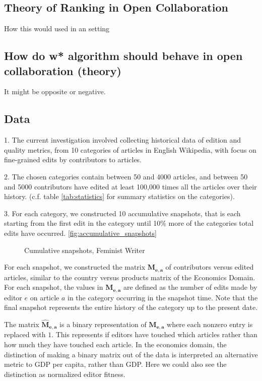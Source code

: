 \documentclass{acm_proc_article-sp}
\begin{document}
\subsection{Theory of Ranking in Open Collaboration}
How this would used in an setting

\subsection{How do w* algorithm should behave in open collaboration (theory)}

It might be opposite or negative.

\subsection{Data}
1. The current investigation involved collecting historical data of edition and quality metrics, from 10 categories of articles in English Wikipedia, with focus on fine-grained edits by contributors to articles.

2. The chosen categories contain between 50 and 4000 articles, and between 50 and 5000 contributors have edited at least 100,000 times all the articles over their history. (c.f. table \ref{tab:statistics} for summary statistics on the categories). 

3. For each category, we constructed 10 accumulative snapshots, that is each starting from the first edit in the category until 10\% more of the categories total edits have occurred. \ref{fig:accumulative_snapshots}

\begin{figure}[!t]
\centering
\caption{Cumulative snapshots, Feminist Writer}
\label{fig:cumsnaps}
\end{figure}

 For each snapshot, we constructed the matrix $\mathbf{M_{e,a}}$ of contributors versus edited articles, similar to the country versus products matrix of the Economics Domain. For each snapshot, the values in $\mathbf{M_{e,a}}$ are defined as the number of edits made by editor $e$ on article $a$ in the category occurring in the snapshot time. Note that the final snapshot represents the entire history of the category up to the present date.


 
The matrix $\mathbf{\hat{M}_{e,a}}$ is a binary representation of $\mathbf{M_{e,a}}$ where each nonzero entry is replaced with $1$. This represents if editors have touched which articles rather than how much they have touched each article. In the economics domain, the distinction of making a binary matrix out of the data is interpreted an alternative metric to GDP per capita, rather than GDP. Here we could also see the distinction as normalized editor fitness.
\end{document}

